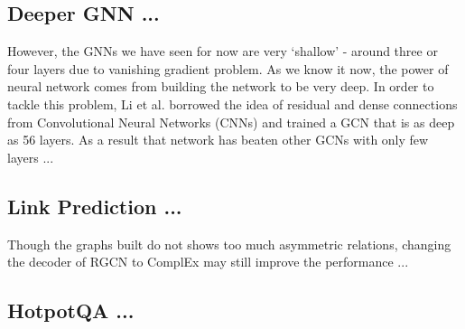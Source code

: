 \documentclass[12pt]{report}
\begin{document}
\subsection{Deeper GNN ...}
However, the GNNs we have seen for now are very `shallow' - around three or four
layers due to vanishing gradient problem. As we know it now, the power of neural network comes from building
the network to be very deep. In order to tackle this problem, Li et al. \cite{li_deepgcns:_2019} borrowed
the idea of residual and dense connections from Convolutional Neural Networks (CNNs) and trained a GCN
that is as deep as 56 layers. As a result that network has beaten other GCNs with only few layers ...

\subsection{Link Prediction ...}
Though the graphs built do not shows too much asymmetric relations, changing the decoder of RGCN to ComplEx may still improve the performance ...

\subsection{HotpotQA ...}


\appendix



\end{document}
